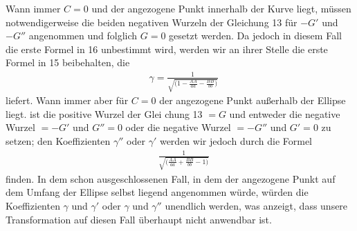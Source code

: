 Wann immer $C=0$ und der angezogene Punkt innerhalb der Kurve liegt, müssen notwendigerweise die beiden negativen Wurzeln der Gleichung 13 für $-G'$ und $-G''$ angenommen und folglich $G=0$ gesetzt werden. Da jedoch in diesem Fall die erste Formel in 16 unbestimmt wird, werden wir an ihrer Stelle die erste Formel in 15 beibehalten, die
\[
\begin{aligned}
&\gamma=\frac{1}{\surd{\bigl(1-\frac{AA}{aa}-\frac{BB}{bb}\bigr)}}
\end{aligned}
\]
liefert. 
Wann immer aber für $C=0$ der angezogene Punkt außerhalb der Ellipse liegt. ist die positive Wurzel der Glei%
chung 13 $=G$ und entweder die negative Wurzel $=-G'$ und $G''=0$ oder die negative Wurzel $=-G''$ und $G'=0$ zu setzen; den Koeffizienten $\gamma''$ oder $\gamma'$ werden wir jedoch durch die Formel
\[
\begin{aligned}
&\frac{1}{\surd{\bigl(\frac{AA}{aa}+\frac{BB}{bb}-1\bigr)}}
\end{aligned}
\]
finden. In dem schon ausgeschlossenen Fall, in dem der angezogene Punkt auf dem Umfang der Ellipse selbst liegend angenommen würde, würden die Koeffizienten $\gamma$ und $\gamma'$ oder $\gamma$ und $\gamma''$ unendlich werden, was anzeigt, dass unsere Transformation auf diesen Fall überhaupt nicht anwendbar ist.

\clearpage
\endgroup
